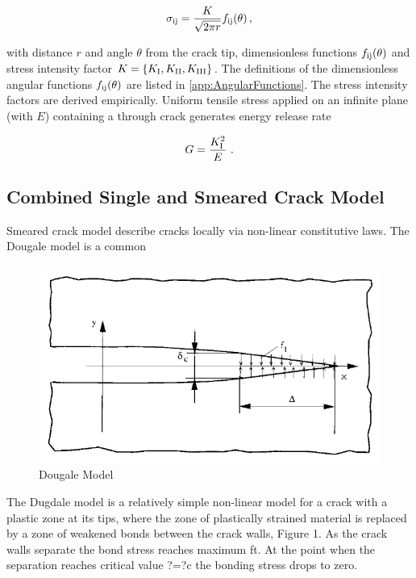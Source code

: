 \documentclass[format=acmtog, 12pt, screen=true, review=false]{acmart}
\begin{document}
\begin{equation}
    \sigma_{\rm{ij}}=\frac{K}{\sqrt{2\pi r}}f_{\rm{ij}}(\theta)\,,
\end{equation}

with distance $r$ and angle $\theta$ from the crack tip, dimensionless functions $f_{\rm{ij}}(\theta)$ and stress intensity factor $K=\{K_{\rm{I}},K_{\rm{II}},K_{\rm{III}}\}$. The definitions of the dimensionless angular functions $f_{\rm{ij}}(\theta)$ are listed in \autoref{app:AngularFunctions}. The stress intensity factors \cite{And05, Xu11} are derived empirically. Uniform tensile stress applied on an infinite plane (with  $E$) containing a through crack generates energy release rate

\begin{equation}
    G = \frac{K_{\rm{I}}^2}{E}\,\,.
\end{equation}

\subsection{Combined Single and Smeared Crack Model}

Smeared crack model describe cracks locally via non-linear constitutive laws. The Dougale model is a common  

\begin{figure}[h]
  \centering
  \label{fig:Douglas}
  \includegraphics[width=\linewidth]{Dougale.PNG}
  \caption{Dougale Model \cite{Lat15}}
\end{figure}

The Dugdale model is a relatively simple non-linear model for a crack with a plastic zone at its tips, where the zone of plastically strained material is replaced by a zone of weakened bonds between the crack walls, Figure 1. As the crack walls separate the bond stress reaches maximum ft. At the point when the separation reaches critical value ?=?c the bonding stress drops to zero.
\end{document}
